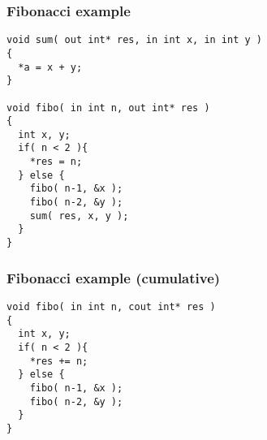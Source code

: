 \begin{frame}[fragile]
  \frametitle{Fibonacci example}
\begin{block}{}
\begin{lstlisting}
void sum( out int* res, in int x, in int y )
{
  *a = x + y;
}

void fibo( in int n, out int* res )
{
  int x, y;
  if( n < 2 ){
    *res = n;
  } else {
    fibo( n-1, &x );
    fibo( n-2, &y );
    sum( res, x, y );
  }
}
\end{lstlisting}
\end{block}
%
%
\end{frame}
\begin{frame}[fragile]
  \frametitle{Fibonacci example (cumulative)}
\begin{block}{}
\begin{lstlisting}
void fibo( in int n, cout int* res )
{
  int x, y;
  if( n < 2 ){
    *res += n;
  } else {
    fibo( n-1, &x );
    fibo( n-2, &y );
  }
}
\end{lstlisting}
\end{block}
%
%
\end{frame}
